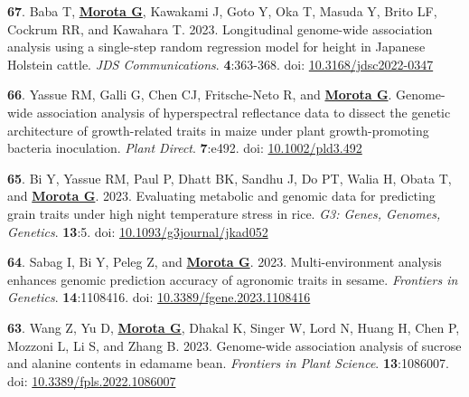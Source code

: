 \documentclass[margin,line,10pt]{res}
\newenvironment{list1}{
  \begin{list}{\ding{113}}{%
      \setlength{\itemsep}{0in}
      \setlength{\parsep}{0in} \setlength{\parskip}{0in}
      \setlength{\topsep}{0in} \setlength{\partopsep}{0in} 
      \setlength{\leftmargin}{0.17in}}}{\end{list}}
\begin{document}
\begin{resume}
\begin{list1}
      \vspace{0.5cm}

  \item  [{\bf 67}.] Baba T, \textbf{\underline{Morota G}}, Kawakami J, Goto Y, Oka T, Masuda Y, Brito LF, Cockrum RR, and Kawahara T. 2023. Longitudinal genome-wide association analysis using a single-step random regression model for height in Japanese Holstein cattle.  \emph{JDS Communications}. \textbf{4}:363-368. doi: \textcolor{blue}{\href{https://doi.org/10.3168/jdsc2022-0347}{10.3168/jdsc2022-0347}} 


  \vspace{0.5cm}

  \item [{\bf 66}.] Yassue RM, Galli G, Chen CJ, Fritsche-Neto R, and \textbf{\underline{Morota G}}.  Genome-wide association analysis of hyperspectral reflectance data to dissect the genetic architecture of growth-related traits in maize under plant growth-promoting bacteria inoculation. \emph{Plant Direct}. \textbf{7}:e492. doi: \textcolor{blue}{\href{https://doi.org/10.1002/pld3.492}{10.1002/pld3.492}}  

  \vspace{0.5cm}

  \item [{\bf 65}.] Bi Y, Yassue RM, Paul P, Dhatt BK, Sandhu J, Do PT, Walia H, Obata T, and \textbf{\underline{Morota G}}. 2023. Evaluating metabolic and genomic data for predicting grain traits under high night temperature stress in rice. \emph{G3: Genes, Genomes, Genetics}. \textbf{13}:5. doi: \textcolor{blue}{\href{https://doi.org/10.1093/g3journal/jkad052}{10.1093/g3journal/jkad052}}  

  \vspace{0.5cm}

  \item [{\bf 64}.] Sabag I, Bi Y, Peleg Z, and \textbf{\underline{Morota G}}. 2023. Multi-environment analysis enhances genomic prediction accuracy of agronomic traits in sesame. \emph{Frontiers in Genetics}. \textbf{14}:1108416. doi: \textcolor{blue}{\href{https://doi.org/10.3389/fgene.2023.1108416}{10.3389/fgene.2023.1108416}}  

     \vspace{0.5cm}

  \item  [{\bf 63}.] Wang Z, Yu D, \textbf{\underline{Morota G}}, Dhakal K, Singer W, Lord N, Huang H, Chen P, Mozzoni L, Li S, and Zhang B. 2023. Genome-wide association analysis of sucrose and alanine contents in edamame bean. \emph{Frontiers in Plant Science}. \textbf{13}:1086007. doi: \textcolor{blue}{\href{10.3389/fpls.2022.1086007}{10.3389/fpls.2022.1086007}}  


\end{list1}
\end{resume}
\end{document}

